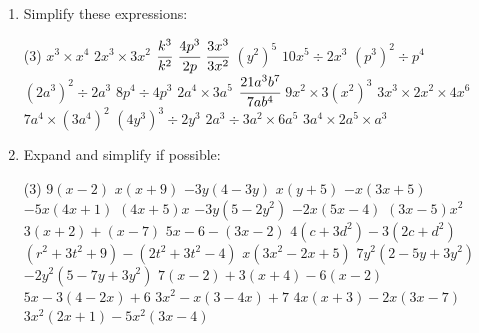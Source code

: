 \documentclass[fleqn, twoside]{article}
\begin{document}
\newpage
{}
\exercise{}
\begin{enumerate}
    \item Simplify these expressions:
        \vspace{-3mm}
        \begin{tasks}(3) %
            \task $x^3 \times x^4$                    %
            \task $2x^3 \times 3x^2$                  %
            \task $\cfrac{k^3}{k^2}$                  %
            \task $\cfrac{4p^3}{2p}$                  %
            \task $\cfrac{3x^3}{3x^2}$                %
            \task $(y^2)^5$                           %
            \task $10x^5 \div 2x^3$                   %
            \task $(p^3)^2 \div p^4$                  %
            \task $(2a^3)^2 \div 2a^3$                %
            \task $8p^4 \div 4p^3$                    %
            \task $2a^4 \times 3a^5$                  %
            \task $\cfrac{21a^3b^7}{7ab^4}$           %
            \task $9x^2 \times 3(x^2)^3$              %
            \task $3x^3 \times 2x^2 \times 4x^6$      %
            \task $7a^4 \times (3a^4)^2$              %
            \task $(4y^3)^3 \div 2y^3$                %
            \task $2a^3 \div 3a^2 \times 6a^5$        %
            \task $3a^4 \times 2a^5 \times a^3$       %
        \end{tasks}

    \vspace{4mm}
    \item Expand and simplify if possible:
        \begin{tasks}(3) %
            \task $9(x-2)$                            %
            \task $x(x+9)$                            %
            \task $-3y(4-3y)$                         %
            \task $x(y+5)$                            %
            \task $-x(3x+5)$                          %
            \task $-5x(4x+1)$                         %
            \task $(4x+5)x$                           %
            \task $-3y(5-2y^2)$                       %
            \task $-2x(5x-4)$                         %
            \task $(3x-5)x^2$                         %
            \task $3(x+2) + (x-7)$                    %
            \task $5x-6-(3x-2)$                       %
            \task $4(c+3d^2)-3(2c+d^2)$               %
            \task $(r^2+3t^2+9)-(2t^2+3t^2-4)$        %
            \task $x(3x^2-2x+5)$                      %
            \task $7y^2(2-5y+3y^2)$                   %
            \task $-2y^2(5-7y+3y^2)$                  %
            \task $7(x-2)+3(x+4)-6(x-2)$              %
            \task $5x-3(4-2x)+6$                      %
            \task $3x^2-x(3-4x)+7$                    %
            \task $4x(x+3)-2x(3x-7)$                  %
            \task $3x^2(2x+1)-5x^2(3x-4)$             %
        \end{tasks}


\end{enumerate}
\end{document}
